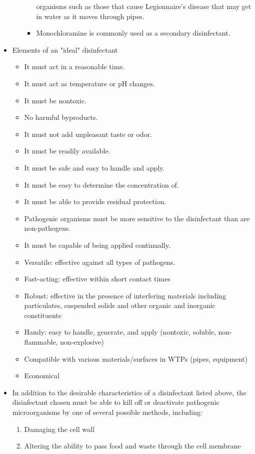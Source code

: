 \begin{itemize}
\begin{enumerate}
\begin{itemize}
organisms such as those that cause Legionnaire’s disease that may get in water as it moves through pipes.
\item Monochloramine is commonly used as a secondary disinfectant.
\end{itemize}
\end{enumerate}
\item Elements of an "ideal" disinfectant
\begin{itemize}
\item It must act in a reasonable time.
\item It must act as temperature or pH changes.
\item It must be nontoxic.
\item No harmful byproducts.
\item It must not add unpleasant taste or odor.
\item It must be readily available.
\item It must be safe and easy to handle and apply.
\item It must be easy to determine the concentration of.
\item It must be able to provide residual protection.
\item Pathogenic organisms must be more sensitive to the disinfectant than are non-pathogens.
\item It must be capable of being applied continually.
\item Versatile:  effective against all types of pathogens.
\item Fast-acting:  effective within short contact times
\item Robust: effective in the presence of interfering materials including particulates, suspended solids and other organic and inorganic constituents
\item Handy: easy to handle, generate, and apply (nontoxic, soluble, non-flammable, non-explosive)
\item Compatible with various materials/surfaces in WTPs (pipes, equipment)
\item Economical
\end{itemize}
\item In addition to the desirable characteristics of a disinfectant listed above, the disinfectant chosen must be able to kill off or deactivate pathogenic microorganisms by one of several possible methods, including:
\begin{enumerate}
\item Damaging the cell wall
\item Altering the ability to pass food and waste through the cell membrane

\end{enumerate}
\end{itemize}
